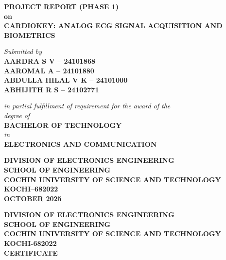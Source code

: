 \documentclass[12pt,a4paper]{report}
\begin{document}
\begin{titlepage}
\begin{center}
\begin{figure}[h]
    \centering
     
\end{figure}

\vfill %

\Large \textbf{PROJECT REPORT (PHASE 1)}\\[0.3cm]
\large \textbf{on}\\[0.3cm]
\LARGE \textbf{CARDIOKEY: ANALOG ECG SIGNAL ACQUISITION AND BIOMETRICS}

\vfill %

\large \textit{Submitted by}\\[0.4cm]
{\large
\textbf{AARDRA S V – 24101868}\\
\textbf{AAROMAL A – 24101880}\\
\textbf{ABDULLA HILAL V K – 24101000}\\
\textbf{ABHIJITH R S – 24102771}}

\vfill %

\textit{in partial fulfillment of requirement for the award of the}\\[0.2cm]
\textit{degree of}\\[0.4cm]
\Large \textbf{BACHELOR OF TECHNOLOGY}\\[0.2cm]
\large \textit{in}\\[0.2cm]
\Large \textbf{ELECTRONICS AND COMMUNICATION}

\vfill %

\large \textbf{DIVISION OF ELECTRONICS ENGINEERING}\\
\textbf{SCHOOL OF ENGINEERING}\\
\textbf{COCHIN UNIVERSITY OF SCIENCE AND TECHNOLOGY}\\
\textbf{KOCHI--682022}\\[0.4cm]
\textbf{OCTOBER 2025}

\end{center}
\end{titlepage}
\newpage
{}
\begin{center}
\large \textbf{DIVISION OF ELECTRONICS ENGINEERING}\\
\textbf{SCHOOL OF ENGINEERING}\\
\textbf{COCHIN UNIVERSITY OF SCIENCE AND TECHNOLOGY}\\
\textbf{KOCHI-682022}\\[1.5cm]

\Large \textbf{CERTIFICATE}\\[1cm]
\end{center}
\end{document}
